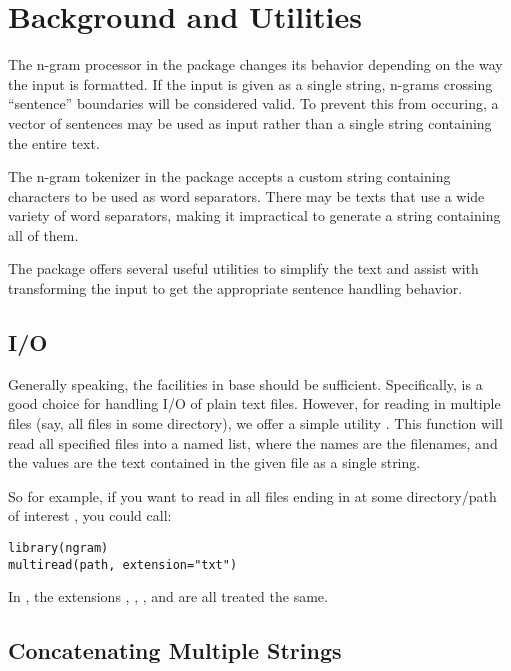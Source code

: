 \section{Background and Utilities}\label{sec:utils}

The n-gram processor in the  package changes its behavior depending
on the way the input is formatted. If the input is given as a single string,
n-grams crossing ``sentence'' boundaries will be considered valid. To prevent
this from occuring, a vector of sentences may be used as input rather than a
single string containing the entire text.

The n-gram tokenizer in the  package accepts a custom string
containing characters to be used as word separators. There may be texts that use
a wide variety of word separators, making it impractical to generate a string
containing all of them.

The  package offers several useful utilities to simplify the text and
assist with transforming the input to get the appropriate sentence handling
behavior.

\subsection{I/O}

Generally speaking, the facilities in base  should be sufficient.
Specifically,  is a good choice for handling I/O of plain text
files.  However, for reading in multiple files (say, all  files in
some directory), we offer a simple utility .  This function
will read all specified files into a named list, where the names are the
filenames, and the values are the text contained in the given file as a single
string.  

So for example, if you want to read in all files ending in  at some
directory/path of interest , you could call:

\begin{lstlisting}[language=rr]
library(ngram)
multiread(path, extension="txt")
\end{lstlisting}

In , the extensions , , ,
and  are all treated the same.



\subsection{Concatenating Multiple Strings}

